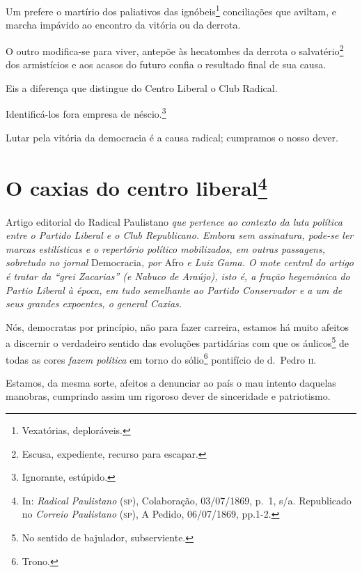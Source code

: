 Um prefere o martírio dos paliativos das ignóbeis\footnote{Vexatórias,
  deploráveis.} conciliações que aviltam, e marcha impávido ao encontro
da vitória ou da derrota.

O outro modifica-se para viver, antepõe às hecatombes da derrota o
salvatério\footnote{Escusa, expediente, recurso para escapar.} dos
armistícios e aos acasos do futuro confia o resultado final de sua
causa.

Eis a diferença que distingue do Centro Liberal o Club Radical.

Identificá-los fora empresa de néscio.\footnote{Ignorante, estúpido.}

Lutar pela vitória da democracia é a causa radical; cumpramos o nosso
dever.

\chapter{O caxias do centro liberal\footnote{In: \emph{Radical Paulistano}
  (\textsc{sp}), Colaboração, 03/07/1869, p.~1, s/a. Republicado no \emph{Correio
  Paulistano} (\textsc{sp}), A Pedido, 06/07/1869, pp.1-2.}}

\begin{didascalia}
Artigo editorial do Radical Paulistano \emph{que pertence ao contexto
da luta política entre o Partido Liberal e o Club Republicano. Embora
sem assinatura, pode-se ler marcas estilísticas e o repertório político
mobilizados, em outras passagens, sobretudo no jornal} Democracia\emph{,
por} Afro \emph{e Luiz Gama. O mote central do artigo é tratar da ``grei
Zacarias'' (e Nabuco de Araújo), isto é, a fração hegemônica do Partio
Liberal à época, em tudo semelhante ao Partido Conservador e a um de
seus grandes expoentes, o general Caxias.}
\end{didascalia}



Nós, democratas por princípio, não para fazer carreira, estamos há muito
afeitos a discernir o verdadeiro sentido das evoluções partidárias com
que os áulicos\footnote{No sentido de bajulador, subserviente.} de
todas as cores \emph{fazem política} em torno do sólio\footnote{Trono.}
pontifício de d.~Pedro \textsc{ii}.

Estamos, da mesma sorte, afeitos a denunciar ao país o mau intento
daquelas manobras, cumprindo assim um rigoroso dever de sinceridade e
patriotismo.

